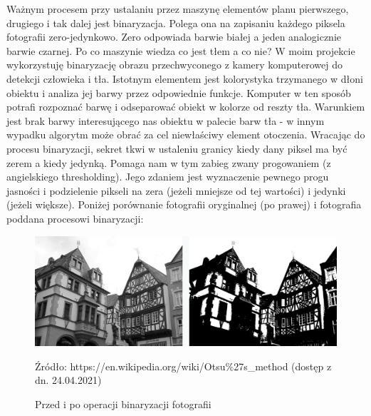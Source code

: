 \documentclass{article}
\begin{document}
	\par
	Ważnym procesem przy ustalaniu przez maszynę elementów planu pierwszego, \linebreak drugiego i tak dalej jest binaryzacja. Polega ona na zapisaniu każdego piksela fotografii zero-jedynkowo. Zero odpowiada barwie białej a jeden analogicznie barwie czarnej. Po co maszynie wiedza co jest tłem a co nie? W moim projekcie wykorzystuję binaryzację obrazu przechwyconego z kamery komputerowej do detekcji człowieka i tła. Istotnym elementem jest kolorystyka trzymanego w dłoni obiektu i analiza jej barwy przez odpowiednie funkcje. Komputer w ten sposób potrafi rozpoznać barwę i odseparować obiekt w kolorze od reszty tła. Warunkiem jest brak barwy interesującego nas obiektu w palecie barw tła - w innym wypadku algorytm może obrać za cel niewłaściwy element otoczenia. Wracając do procesu binaryzacji, sekret tkwi w ustaleniu granicy kiedy dany piksel ma być zerem a kiedy jedynką. Pomaga nam w tym zabieg zwany progowaniem (z angielskiego thresholding). Jego zdaniem jest wyznaczenie pewnego progu jasności i podzielenie pikseli na zera (jeżeli mniejsze od tej wartości) i jedynki (jeżeli większe). Poniżej porównanie fotografii oryginalnej (po prawej) i fotografia poddana procesowi binaryzacji:
	\begin{figure}
		\centering
		\includegraphics[width=15cm]{binary}
		\caption{Przed i po operacji binaryzacji fotografii}
		Źródło: https://en.wikipedia.org/wiki/Otsu\%27s\_method (dostęp z dn. 24.04.2021)
	\end{figure}
\end{document}
